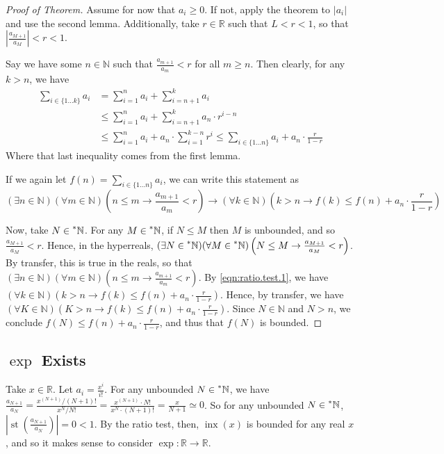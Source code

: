 \documentclass{article}
\newcommand{\stp}[1]{\st\left(#1\right)}
\newcommand{\reals}{\mathbb{R}}
\newcommand{\nats}{\mathbb{N}}
\newcommand{\hnats}{\prescript{*}{}{\mathbb{N}}}
\DeclareMathOperator{\st}{st}
\DeclareMathOperator{\inx}{inx}
\theoremstyle{definition}
\begin{document}
\begin{proof}[Proof of Theorem]
    Assume for now that $a_i \geq 0$. If not, apply the theorem to $|a_i|$ and use the second lemma. Additionally, take $r \in \reals$ such that $L < r < 1$, so that $\left|\frac{a_{M+1}}{a_M}\right| < r < 1$.
    
    Say we have some $n \in \nats$ such that $\frac{a_{m+1}}{a_m} < r$ for all $m \geq n$. Then clearly, for any $k > n$, we have 
    \begin{align*}
    \sum_{i \in \{1\ldots k\}} a_i &= \sum_{i = 1}^n a_i + \sum_{i = n+1}^k a_i  \\
        &\leq \sum_{i = 1}^n a_i + \sum_{i = n+1}^k a_n \cdot r^{i - n} \\
        &\leq \sum_{i = 1}^n a_i + a_n \cdot \sum_{i = 1}^{k-n}  r^{i} \leq \sum_{i \in \{1\ldots n\}} a_i + a_n \cdot \frac{r}{1-r}
    \end{align*}
    Where that last inequality comes from the first lemma. 

    If we again let $f(n) = \sum_{i \in \{1\ldots n\}} a_i$, we can write this statement as
    \begin{equation} \label{eqn:ratio.test.1}
        (\exists n \in \nats)(\forall m \in \nats)\left(n \leq m \to \frac{a_{m+1}}{a_m} < r\right) \to (\forall k \in \nats)\left(k > n \to f(k) \leq f(n) + a_n\cdot\frac{r}{1-r}\right) 
    \end{equation}

    Now, take $N \in \hnats$. For any $M \in \hnats$, if $N \leq M$ then $M$ is unbounded, and so $\frac{a_{M+1}}{a_M} < r$. Hence, in the hyperreals, $(\exists N \in \hnats)(\forall M \in \hnats)\left(N \leq M \to \frac{a_{M+1}}{a_M} < r\right)$. By transfer, this is true in the reals, so that $(\exists n \in \nats)(\forall m \in \nats)\left(n \leq m \to \frac{a_{m+1}}{a_m} < r\right)$. By \ref{eqn:ratio.test.1}, we have $(\forall k \in \nats)\left(k > n \to f(k) \leq f(n) + a_n\cdot\frac{r}{1-r}\right)$. Hence, by transfer, we have $(\forall K \in \nats)\left(K > n \to f(k) \leq f(n) + a_n\cdot\frac{r}{1-r}\right)$. Since $N \in \nats$ and $N > n$, we conclude $f(N) \leq f(n) + a_n\cdot\frac{r}{1-r}$, and thus that $f(N)$ is bounded.
\end{proof}

\subsection{$\exp$ Exists}
Take $x \in \reals$. Let $a_i = \frac{x^i}{i!}$. For any unbounded $N \in \hnats$, we have $\frac{a_{N+1}}{a_N} = \frac{x^{(N+1)} / (N+1)!}{x^N / N!} = \frac{x^{(N+1)} \cdot N!}{x^N \cdot (N+1)!} = \frac{x}{N+1} \simeq 0$. So for any unbounded $N \in \hnats$, $\left|\stp{\frac{a_{N+1}}{a_N}}\right| = 0 < 1$. By the ratio test, then, $\inx(x)$ is bounded for any real $x$, and so it makes sense to consider $\exp: \reals \to \reals$.
\end{document}
